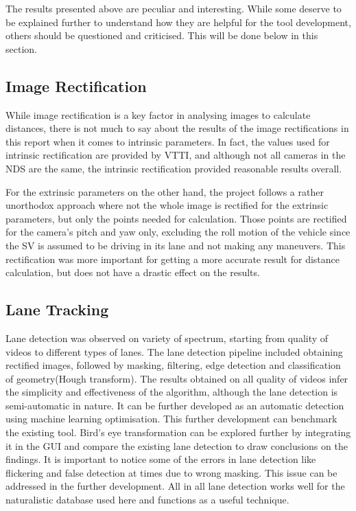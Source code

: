 
The results presented above are peculiar and interesting. While some deserve to be explained further to understand how they are helpful for the tool development, others should be questioned and criticised. This will be done below in this section.

\subsection{Image Rectification}
While image rectification is a key factor in analysing images to calculate distances, there is not much to say about the results of the image rectifications in this report when it comes to intrinsic parameters. In fact, the values used for intrinsic rectification are provided by VTTI, and although not all cameras in the NDS are the same, the intrinsic rectification provided reasonable results overall.

For the extrinsic parameters on the other hand, the project follows a rather unorthodox approach where not the whole image is rectified for the extrinsic parameters, but only the points needed for calculation. Those points are rectified for the camera's pitch and yaw only, excluding the roll motion of the vehicle since the SV is assumed to be driving in its lane and not making any maneuvers. This rectification was more important for getting a more accurate result for distance calculation, but does not have a drastic effect on the results.

\subsection{Lane Tracking}
Lane detection was observed on variety of spectrum, starting from quality of videos to different types of lanes. The lane detection pipeline included obtaining rectified images, followed by masking, filtering, edge detection and classification of geometry(Hough transform). The results obtained on all quality of videos infer the simplicity and effectiveness of the algorithm, although the lane detection is semi-automatic in nature. It can be further developed as an automatic detection using machine learning optimisation. This further development can benchmark the existing tool. Bird's eye transformation can be explored further by integrating it in the GUI and compare the existing lane detection to draw conclusions on the findings. It is important to notice some of the errors in lane detection like flickering and false detection at times due to wrong masking. This issue can be addressed in the further development. All in all lane detection works well for the naturalistic database used here and functions as a useful technique.


